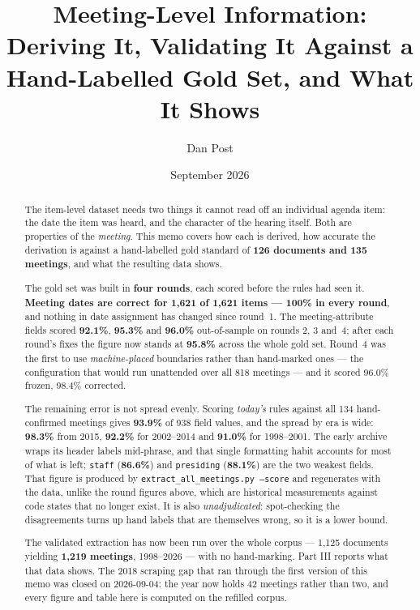 \documentclass[11pt]{article}
\title{Meeting-Level Information:\\
Deriving It, Validating It Against a Hand-Labelled Gold Set, and What It Shows}
\author{Dan Post}
\date{September 2026}
\begin{document}
\maketitle

\begin{abstract}
\noindent
The item-level dataset needs two things it cannot read off an individual agenda item: the
date the item was heard, and the character of the hearing itself. Both are properties of
the \emph{meeting}. This memo covers how each is derived, how accurate the derivation is
against a hand-labelled gold standard of \textbf{126 documents and 135 meetings}, and what
the resulting data shows.

\medskip\noindent
The gold set was built in \textbf{four rounds}, each scored before the rules had seen it.
\textbf{Meeting dates are correct for 1{,}621 of 1{,}621 items --- 100\% in every round},
and nothing in date assignment has changed since round~1. The meeting-attribute fields
scored \textbf{92.1\%}, \textbf{95.3\%} and \textbf{96.0\%} out-of-sample on rounds 2, 3
and~4; after each round's fixes the figure now stands at \textbf{95.8\%} across the whole
gold set. Round~4 was the first to use \emph{machine-placed} boundaries rather than
hand-marked ones --- the configuration that would run unattended over all 818 meetings ---
and it scored 96.0\% frozen, 98.4\% corrected.

\medskip\noindent
The remaining error is not spread evenly. Scoring \emph{today's} rules against all
134 hand-confirmed meetings gives \textbf{93.9\%} of 938 field values, and the spread
by era is wide: \textbf{98.3\%} from 2015, \textbf{92.2\%} for 2002--2014 and
\textbf{91.0\%} for 1998--2001. The early archive wraps its header labels mid-phrase, and
that single formatting habit accounts for most of what is left; \texttt{staff}
(\textbf{86.6\%}) and \texttt{presiding} (\textbf{88.1\%}) are the two weakest fields.
That figure is produced by \texttt{extract\_all\_meetings.py --score} and regenerates with
the data, unlike the round figures above, which are historical measurements against code
states that no longer exist. It is also \emph{unadjudicated}: spot-checking the
disagreements turns up hand labels that are themselves wrong, so it is a lower bound.

\medskip\noindent
The validated extraction has now been run over the whole corpus --- 1{,}125 documents
yielding \textbf{1{,}219 meetings}, 1998--2026 --- with no hand-marking. Part III reports
what that data shows. The 2018 scraping gap that ran through the first version of this memo
was closed on 2026-09-04: the year now holds 42 meetings rather than two, and every figure
and table here is computed on the refilled corpus.
\end{abstract}
\end{document}
